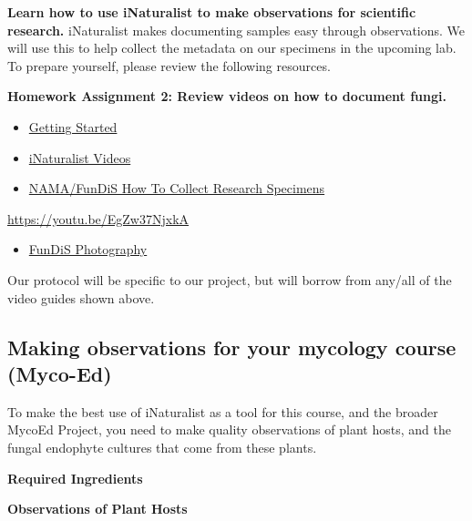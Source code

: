 \documentclass[
  letterpaper,
  DIV=11,
  numbers=noendperiod]{scrreprt}
\providecommand{\tightlist}{%
  \setlength{\itemsep}{0pt}\setlength{\parskip}{0pt}}
\begin{document}
\textbf{Learn how to use iNaturalist to make observations for scientific
research.} iNaturalist makes documenting samples easy through
observations. We will use this to help collect the metadata on our
specimens in the upcoming lab. To prepare yourself, please review the
following resources.

\textbf{Homework Assignment 2: Review videos on how to document fungi.}

\begin{itemize}
\tightlist
\item[$\square$]
  \href{https://www.inaturalist.org/pages/getting+started}{Getting
  Started}
\item[$\square$]
  \href{https://inaturalist.freshdesk.com/en/support/solutions/folders/151000547795}{iNaturalist
  Videos}
\item[$\square$]
  \href{https://youtu.be/EgZw37NjxkA}{NAMA/FunDiS How To Collect
  Research Specimens}
\end{itemize}

\url{https://youtu.be/EgZw37NjxkA}

\begin{itemize}
\tightlist
\item[$\square$]
  \href{https://fundis.org/get-started/photograph}{FunDiS Photography}
\end{itemize}

Our protocol will be specific to our project, but will borrow from
any/all of the video guides shown above.

\subsection*{Making observations for your mycology course
(Myco-Ed)}\label{making-observations-for-your-mycology-course-myco-ed}

To make the best use of iNaturalist as a tool for this course, and the
broader MycoEd Project, you need to make quality observations of plant
hosts, and the fungal endophyte cultures that come from these plants.

\textbf{Required Ingredients}

\textbf{Observations of Plant Hosts}
\end{document}
